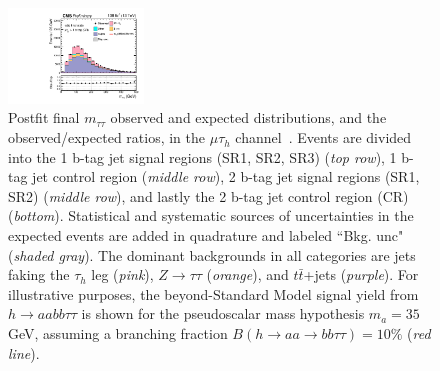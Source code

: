 \begin{figure}[ht]
\begin{center}
        \includegraphics[width=0.32\textwidth]{figures/ch-10-results/mt_all_7_post_prelim-yes.pdf}
    \end{center}
    \caption[Postfit final observed and expected $m_{\tau\tau}$ distributions in the $\mu\tau_{h}$ channel, for the 1 b-tag jet and 2 b-tag jet signal and control regions.]{Postfit final $m_{\tau\tau}$ observed and expected distributions, and the observed/expected ratios, in the $\mu\tau_{h}$ channel~\cite{CMS-AN-20-213}. Events are divided into the 1 b-tag jet signal regions (SR1, SR2, SR3) (\textit{top row}), 1 b-tag jet control region (\textit{middle row}), 2 b-tag jet signal regions (SR1, SR2) (\textit{middle row}), and lastly the 2 b-tag jet control region (CR) (\textit{bottom}). Statistical and systematic sources of uncertainties in the expected events are added in quadrature and labeled ``Bkg. unc" (\textit{shaded gray}). The dominant backgrounds in all categories are jets faking the $\tau_{h}$ leg (\textit{pink}), $Z \rightarrow \tau\tau$ (\textit{orange}), and $t\bar{t}$+jets (\textit{purple}). For illustrative purposes, the beyond-Standard Model signal yield from $h\rightarrow aa bb\tau\tau$ is shown for the pseudoscalar mass hypothesis $m_a = 35$ GeV, assuming a branching fraction $B(h \rightarrow aa \rightarrow bb\tau\tau) = 10\%$ (\textit{red line}).}
    \label{fig:results_mtt_postfit_mtall}
\end{figure}

